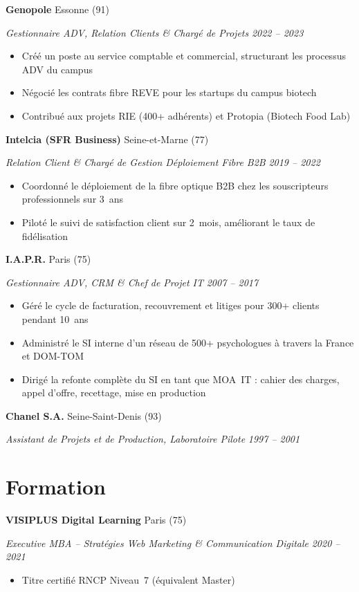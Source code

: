 \documentclass[10pt,letterpaper]{article}
\newcommand{\entry}[4]{%
  \noindent\textbf{#1} \hfill #2 \par\nopagebreak
  \textit{#3} \hfill \textit{#4} \par\nopagebreak
}
\begin{document}
\entry{Genopole}{Essonne (91)}{Gestionnaire ADV, Relation Clients \& Charg\'e de Projets}{2022 -- 2023}
\begin{itemize}
  \item Cr\'e\'e un poste au service comptable et commercial, structurant les processus ADV du campus
  \item N\'egoci\'e les contrats fibre REVE pour les startups du campus biotech
  \item Contribu\'e aux projets RIE (400+ adh\'erents) et Protopia (Biotech Food Lab)
\end{itemize}
\vspace{0.2em}

\entry{Intelcia (SFR Business)}{Seine-et-Marne (77)}{Relation Client \& Charg\'e de Gestion D\'eploiement Fibre B2B}{2019 -- 2022}
\begin{itemize}
  \item Coordonn\'e le d\'eploiement de la fibre optique B2B chez les souscripteurs professionnels sur 3~ans
  \item Pilot\'e le suivi de satisfaction client sur 2~mois, am\'eliorant le taux de fid\'elisation
\end{itemize}
\vspace{0.2em}

\entry{I.A.P.R.}{Paris (75)}{Gestionnaire ADV, CRM \& Chef de Projet IT}{2007 -- 2017}
\begin{itemize}
  \item G\'er\'e le cycle de facturation, recouvrement et litiges pour 300+ clients pendant 10~ans
  \item Administr\'e le SI interne d'un r\'eseau de 500+ psychologues \`a travers la France et DOM-TOM
  \item Dirig\'e la refonte compl\`ete du SI en tant que MOA~IT : cahier des charges, appel d'offre, recettage, mise en production
\end{itemize}
\vspace{0.2em}

\entry{Chanel S.A.}{Seine-Saint-Denis (93)}{Assistant de Projets et de Production, Laboratoire Pilote}{1997 -- 2001}

\section{Formation}

\entry{VISIPLUS Digital Learning}{Paris (75)}{Executive MBA -- Strat\'egies Web Marketing \& Communication Digitale}{2020 -- 2021}
\begin{itemize}
  \item Titre certifi\'e RNCP Niveau~7 (\'equivalent Master)
\end{itemize}
\vspace{0.2em}
\end{document}
